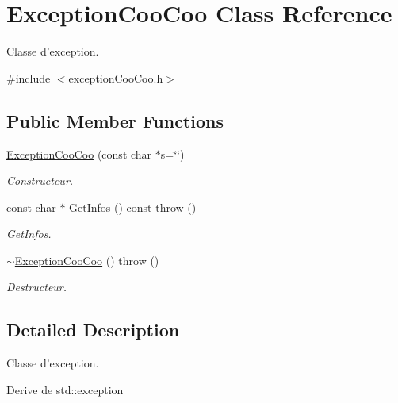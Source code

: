 \hypertarget{class_exception_coo_coo}{\section{Exception\-Coo\-Coo Class Reference}
\label{class_exception_coo_coo}
}


Classe d'exception.  




{\ttfamily \#include $<$exception\-Coo\-Coo.\-h$>$}

\subsection*{Public Member Functions}
\begin{DoxyCompactItemize}
\item 
\hyperlink{class_exception_coo_coo_abc4fda1d887ebf8167aa292b22006cbf}{Exception\-Coo\-Coo} (const char $\ast$s=\char`\"{}\char`\"{})
\begin{DoxyCompactList}\small\item\em Constructeur. \end{DoxyCompactList}\item 
const char $\ast$ \hyperlink{class_exception_coo_coo_a146a13e09e5071f4d9461b11701ba5aa}{Get\-Infos} () const   throw ()
\begin{DoxyCompactList}\small\item\em Get\-Infos. \end{DoxyCompactList}\item 
\hypertarget{class_exception_coo_coo_a4da74063dcd709e6bf23b4d77275a362}{\hyperlink{class_exception_coo_coo_a4da74063dcd709e6bf23b4d77275a362}{$\sim$\-Exception\-Coo\-Coo} ()  throw ()}\label{class_exception_coo_coo_a4da74063dcd709e6bf23b4d77275a362}

\begin{DoxyCompactList}\small\item\em Destructeur. \end{DoxyCompactList}\end{DoxyCompactItemize}


\subsection{Detailed Description}
Classe d'exception. 

Derive de std\-::exception 

